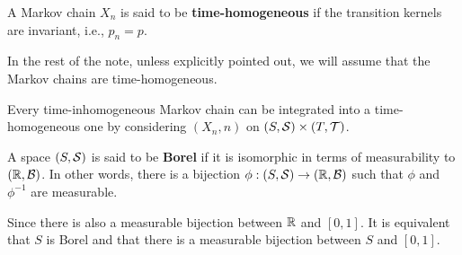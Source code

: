 \begin{definition}
    A Markov chain $X_n$ is said to be \textbf{time-homogeneous} if the 
    transition kernels are invariant, i.e., $p_n = p$. 
\end{definition}
\begin{remark}
    In the rest of the note, unless explicitly pointed out, we will 
    assume that the Markov chains are time-homogeneous. 
\end{remark}
\begin{remark}
    Every time-inhomogeneous Markov chain can be integrated into a time-homogeneous 
    one by considering $(X_n,n)$ on $(S,\S)\times (T,\T)$. 
\end{remark}

\begin{definition}
    A space $(S,\S)$ is said to be \textbf{Borel} if it is isomorphic in terms of 
    measurability to $(\R,\B)$. In other words, there is a bijection $\phi:(S,\S)\to (\R,\B)$ 
    such that $\phi$ and $\phi^{-1}$ are measurable. 
\end{definition}
\begin{remark}
    Since there is also a measurable bijection between $\R$ and $[0,1]$. It is equivalent 
    that $S$ is Borel and that there is a measurable bijection between $S$ and $[0,1]$. 
\end{remark}

